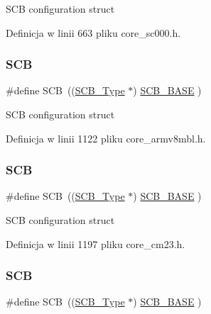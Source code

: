 S\+CB configuration struct 

Definicja w linii 663 pliku core\+\_\+sc000.\+h.

\mbox{\label{group___c_m_s_i_s__core__base_gaaaf6477c2bde2f00f99e3c2fd1060b01}} 
\subsubsection{\texorpdfstring{S\+CB}{SCB}\hspace{0.1cm}{\footnotesize\ttfamily [5/12]}}
{\footnotesize\ttfamily \#define S\+CB~((\hyperlink{struct_s_c_b___type}{S\+C\+B\+\_\+\+Type}       $\ast$)     \hyperlink{group___c_m_s_i_s__core__base_gad55a7ddb8d4b2398b0c1cfec76c0d9fd}{S\+C\+B\+\_\+\+B\+A\+SE}         )}

S\+CB configuration struct 

Definicja w linii 1122 pliku core\+\_\+armv8mbl.\+h.

\mbox{\label{group___c_m_s_i_s__core__base_gaaaf6477c2bde2f00f99e3c2fd1060b01}} 
\subsubsection{\texorpdfstring{S\+CB}{SCB}\hspace{0.1cm}{\footnotesize\ttfamily [6/12]}}
{\footnotesize\ttfamily \#define S\+CB~((\hyperlink{struct_s_c_b___type}{S\+C\+B\+\_\+\+Type}       $\ast$)     \hyperlink{group___c_m_s_i_s__core__base_gad55a7ddb8d4b2398b0c1cfec76c0d9fd}{S\+C\+B\+\_\+\+B\+A\+SE}         )}

S\+CB configuration struct 

Definicja w linii 1197 pliku core\+\_\+cm23.\+h.

\mbox{\label{group___c_m_s_i_s__core__base_gaaaf6477c2bde2f00f99e3c2fd1060b01}} 
\subsubsection{\texorpdfstring{S\+CB}{SCB}\hspace{0.1cm}{\footnotesize\ttfamily [7/12]}}
{\footnotesize\ttfamily \#define S\+CB~((\hyperlink{struct_s_c_b___type}{S\+C\+B\+\_\+\+Type}       $\ast$)     \hyperlink{group___c_m_s_i_s__core__base_gad55a7ddb8d4b2398b0c1cfec76c0d9fd}{S\+C\+B\+\_\+\+B\+A\+SE}      )}


